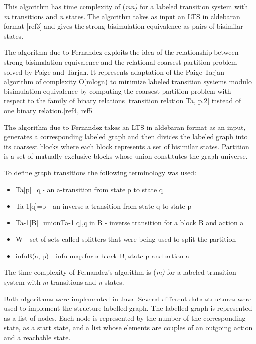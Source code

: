 This algorithm has time complexity of (\emph{mn}\emph) for a labeled transition system with
\emph{m} transitions and \emph{n} states. The algorithm takes as input an LTS in aldebaran format [ref3] 
and gives the strong bisimulation equivalence as pairs of bisimilar states.

The algorithm due to Fernandez exploits the idea of the relationship between strong bisimulation equivalence 
and the relational coarsest partition problem solved by Paige and Tarjan. It represents adaptation of the 
Paige-Tarjan algorithm of complexity O(mlogn) to minimize labeled transition systems modulo bisimulation 
equivalence by computing the coarsest partition problem with respect to the family of binary relations 
[transition relation Ta, p.2] instead of one binary relation.[ref4, ref5]

The algorithm due to Fernandez takes an LTS in aldebaran format as an input, generates a corresponding labeled 
graph and then divides the labeled graph into its coarsest blocks where each block represents a set of bisimilar 
states. Partition is a set of mutually exclusive blocks whose union constitutes the graph universe.

To define graph transitions the following terminology was used: 

\begin{itemize}
	\item Ta[p]={q} - an a-transition from state p to state q
	\item Ta-1[q]={p} - an inverse a-transition from state q to state p
	\item Ta-1[B]=union{Ta-1[q],q in B} - inverse transition for a block B and action a
	\item W - set of sets called splitters that were being used to split the partition
	\item infoB(a, p) - info map for a block B, state p and action a
\end{itemize}

The time complexity of Fernandez's algorithm is (\emph{m\logn}\emph) for a labeled transition system 
with  \emph{m} transitions and \emph{n} states. 

Both algorithms were implemented in Java. Several different data structures were used to implement the structure
labelled graph. The labelled graph is represented as a list of nodes. Each node is represented by the number of the
corresponding state, as a start state, and a list whose elements are couples of an outgoing action and a reachable 
state. 

